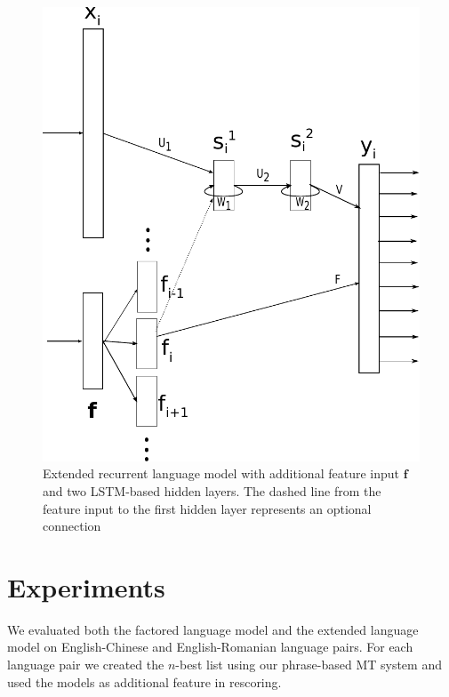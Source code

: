 \documentclass[a4paper]{article}
\begin{document}
\begin{figure} 
\centering 
\includegraphics[width=\columnwidth]{model-extended.pdf}
\caption{Extended recurrent language model with additional feature input $\textbf{f}$ and two LSTM-based hidden layers. The dashed line from the feature input to the first hidden layer represents an optional connection}
\label{fig:model-extended}
\end{figure}
\section{Experiments}
We evaluated both the factored language model and the extended language model on English-Chinese and English-Romanian language pairs. For each language pair we created the $n$-best list using our phrase-based MT system and used the models as additional feature in rescoring.
\end{document}
